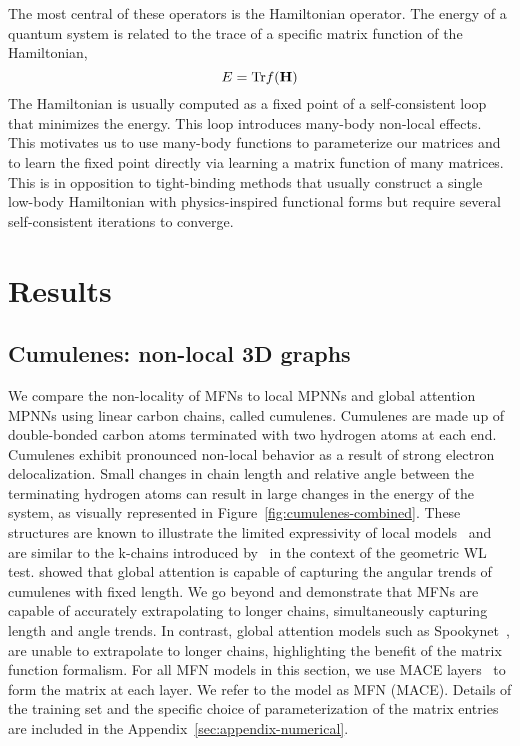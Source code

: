 \documentclass{article} \usepackage{iclr2024_conference,times}
\begin{document}
The most central of these operators is the Hamiltonian operator. The energy of a quantum system is related to the trace of a specific matrix function of the Hamiltonian,
\begin{equation}
    E = \text{Tr}f(\bf{H})
\end{equation}
The Hamiltonian is usually computed as a fixed point of a self-consistent loop that minimizes the energy. This loop introduces many-body non-local effects.
This motivates us to use many-body functions to parameterize our matrices and to learn the fixed point directly via learning a matrix function of many matrices. This is in opposition to tight-binding methods that usually construct a single low-body Hamiltonian with physics-inspired functional forms but require several self-consistent iterations to converge. 


\vspace{-6pt}
\section{Results}
\label{sec:resuts}
\vspace{-6pt}
\subsection{Cumulenes: non-local 3D graphs}
\label{sec:cumulenes}
\vspace{-6pt}
We compare the non-locality of MFNs to local MPNNs and global attention MPNNs using linear carbon chains, called cumulenes. Cumulenes are made up of double-bonded carbon atoms terminated with two hydrogen atoms at each end. Cumulenes exhibit pronounced non-local behavior as a result of strong electron delocalization.  Small changes in chain length and relative angle between the terminating hydrogen atoms can result in large changes in the energy of the system, as visually represented in Figure~\ref{fig:cumulenes-combined}. These structures are known to illustrate the limited expressivity of local models~\citep{unke2021machine} and are similar to the k-chains introduced by~\cite{joshi2023expressive} in the context of the geometric WL test. \cite{frank2022so3krates} showed that global attention is capable of capturing the angular trends of cumulenes with fixed length. We go beyond and demonstrate that MFNs are capable of accurately extrapolating to longer chains, simultaneously capturing length and angle trends. In contrast, global attention models such as Spookynet~\citep{Unke2021}, are unable to extrapolate to longer chains, highlighting the benefit of the matrix function formalism.  For all MFN models in this section, we use MACE layers~\citep{Batatia2022mace} to form the matrix at each layer. We refer to the model as MFN (MACE). Details of the training set and the specific choice of parameterization of the matrix entries are included in the Appendix~\ref{sec:appendix-numerical}.
\end{document}
